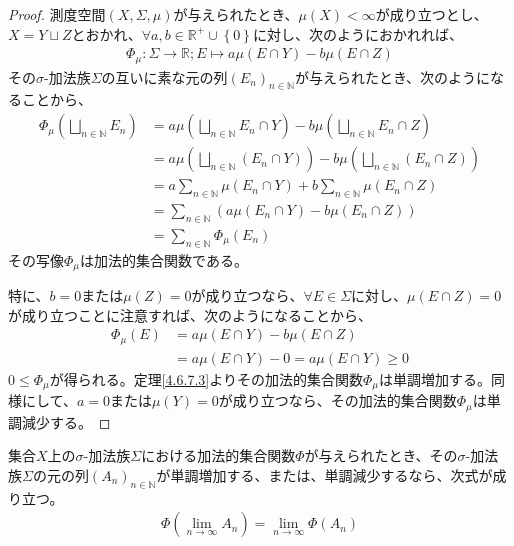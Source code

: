 \documentclass[dvipdfmx]{jsarticle}
\begin{document}
\begin{proof}
測度空間$(X,\varSigma,\mu)$が与えられたとき、$\mu(X) < \infty$が成り立つとし、$X = Y \sqcup Z$とおかれ、$\forall a,b \in \mathbb{R}^{+} \cup \left\{ 0 \right\}$に対し、次のようにおかれれば、
\begin{align*}
\varPhi_{\mu}:\varSigma \rightarrow \mathbb{R};E \mapsto a\mu(E \cap Y) - b\mu(E \cap Z)
\end{align*}
その$\sigma$-加法族$\varSigma$の互いに素な元の列$\left( E_{n} \right)_{n \in \mathbb{N}}$が与えられたとき、次のようになることから、
\begin{align*}
\varPhi_{\mu}\left( \bigsqcup_{n \in \mathbb{N}} E_{n} \right) &= a\mu\left( \bigsqcup_{n \in \mathbb{N}} E_{n} \cap Y \right) - b\mu\left( \bigsqcup_{n \in \mathbb{N}} E_{n} \cap Z \right)\\
&= a\mu\left( \bigsqcup_{n \in \mathbb{N}} \left( E_{n} \cap Y \right) \right) - b\mu\left( \bigsqcup_{n \in \mathbb{N}} \left( E_{n} \cap Z \right) \right)\\
&= a\sum_{n \in \mathbb{N}} {\mu\left( E_{n} \cap Y \right)} + b\sum_{n \in \mathbb{N}} {\mu\left( E_{n} \cap Z \right)}\\
&= \sum_{n \in \mathbb{N}} \left( a\mu\left( E_{n} \cap Y \right) - b\mu\left( E_{n} \cap Z \right) \right)\\
&= \sum_{n \in \mathbb{N}} {\varPhi_{\mu}\left( E_{n} \right)}
\end{align*}
その写像$\varPhi_{\mu}$は加法的集合関数である。\par
特に、$b = 0$または$\mu(Z) = 0$が成り立つなら、$\forall E \in \varSigma$に対し、$\mu(E \cap Z) = 0$が成り立つことに注意すれば、次のようになることから、
\begin{align*}
\varPhi_{\mu}(E) &= a\mu(E \cap Y) - b\mu(E \cap Z)\\
&= a\mu(E \cap Y) - 0 = a\mu(E \cap Y) \geq 0
\end{align*}
$0 \leq \varPhi_{\mu}$が得られる。定理\ref{4.6.7.3}よりその加法的集合関数$\varPhi_{\mu}$は単調増加する。同様にして、$a = 0$または$\mu(Y) = 0$が成り立つなら、その加法的集合関数$\varPhi_{\mu}$は単調減少する。
\end{proof}
\begin{thm}\label{4.6.7.5}
集合$X$上の$\sigma$-加法族$\varSigma$における加法的集合関数$\varPhi$が与えられたとき、その$\sigma$-加法族$\varSigma$の元の列$\left( A_{n} \right)_{n \in \mathbb{N}}$が単調増加する、または、単調減少するなら、次式が成り立つ。
\begin{align*}
\varPhi\left( \lim_{n \rightarrow \infty}A_{n} \right) = \lim_{n \rightarrow \infty}{\varPhi\left( A_{n} \right)}
\end{align*}
\end{thm}
\end{document}
